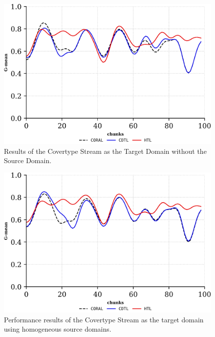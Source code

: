 \begin{figure}[H]
	\centering
	\includegraphics[width=0.8\linewidth]{6_transfer_learning/figures/exp1_0.png}
  \caption{Results of the Covertype Stream as the Target Domain without the Source Domain.}

	\label{fig:6_exp1}
\end{figure}
\begin{figure}[H]
	\centering
	\includegraphics[width=0.8\linewidth]{6_transfer_learning/figures/exp1_1.png}
	\caption{Performance results of the Covertype Stream as the target domain using homogeneous source domains.}

	\label{fig:6_exp2}
\end{figure}

